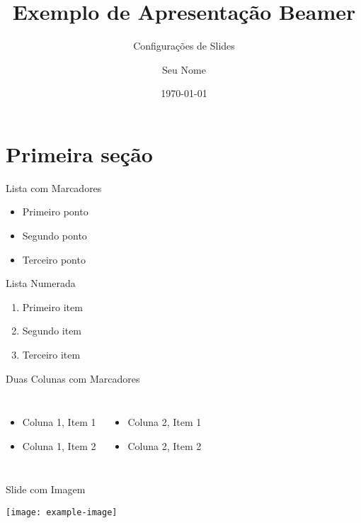 \documentclass[aspectratio=169]{beamer}
\title{Exemplo de Apresentação Beamer}
\subtitle{Configurações de Slides}
\author{Seu Nome}
\date{\today}
\begin{document}
\begin{frame}
    \titlepage
\end{frame}

\section{Primeira seção}

\begin{frame}{Lista com Marcadores}
    \begin{itemize}
        \item Primeiro ponto
        \item Segundo ponto
        \item Terceiro ponto
           \end{itemize}
\end{frame}

\begin{frame}{Lista Numerada}
    \begin{enumerate}
        \item Primeiro item
        \item Segundo item
        \item Terceiro item

    \end{enumerate}
\end{frame}

\begin{frame}{Duas Colunas com Marcadores}
    \begin{columns}
            \begin{itemize}
                \item Coluna 1, Item 1
                \item Coluna 1, Item 2

            \end{itemize}
            \begin{itemize}
                \item Coluna 2, Item 1
                \item Coluna 2, Item 2

            \end{itemize}
    \end{columns}
\end{frame}

\begin{frame}{Slide com Imagem}
    \begin{center}
        \texttt{[image: example-image]} %
    \end{center}
\end{frame}
\end{document}
